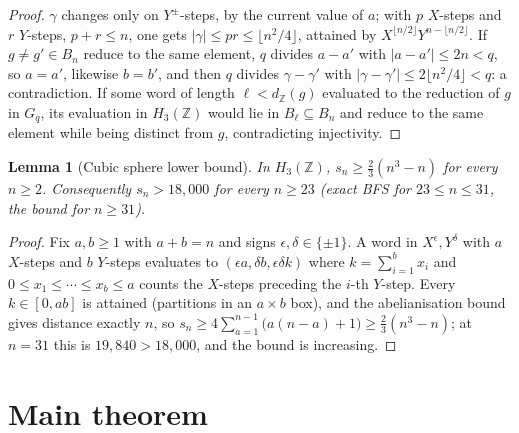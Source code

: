 \documentclass[11pt,a4paper]{article}
\theoremstyle{plain}
\newtheorem{lemma}{Lemma}
\theoremstyle{definition}
\begin{document}
    \begin{proof}
      $\gamma$ changes only on $Y^{\pm}$-steps, by the current value of $a$; with $p$ $X$-steps
      and $r$ $Y$-steps, $p + r \le n$, one gets $\lvert\gamma\rvert \le pr \le \lfloor
      n^2/4\rfloor$, attained by $X^{\lfloor n/2\rfloor}Y^{n - \lfloor n/2\rfloor}$.
      If $g \ne g' \in B_n$ reduce to the same element, $q$ divides $a-a'$ with
      $\lvert a-a'\rvert \le 2n < q$, so $a = a'$, likewise $b = b'$, and then $q$ divides
      $\gamma-\gamma'$ with $\lvert\gamma-\gamma'\rvert \le 2\lfloor n^2/4\rfloor < q$: a
      contradiction.
      If some word of length $\ell < d_{\mathbb{Z}}(g)$ evaluated to the reduction of $g$ in
      $G_q$, its evaluation in $H_3(\mathbb{Z})$ would lie in $B_\ell \subseteq B_n$ and reduce to
      the same element while being distinct from $g$, contradicting injectivity.
    \end{proof}

    \begin{lemma}[Cubic sphere lower bound]
      \label{lem:cubic}
      In $H_3(\mathbb{Z})$, $s_n \ge \tfrac{2}{3}(n^3 - n)$ for every $n \ge 2$.
      Consequently $s_n > 18{,}000$ for every $n \ge 23$ (exact BFS for $23 \le n \le 31$, the
      bound for $n \ge 31$).
    \end{lemma}

    \begin{proof}
      Fix $a, b \ge 1$ with $a + b = n$ and signs $\epsilon, \delta \in \{\pm 1\}$.
      A word in $X^{\epsilon}, Y^{\delta}$ with $a$ $X$-steps and $b$ $Y$-steps evaluates to
      $(\epsilon a, \delta b, \epsilon\delta k)$ where $k = \sum_{i=1}^{b} x_i$ and
      $0 \le x_1 \le \cdots \le x_b \le a$ counts the $X$-steps preceding the $i$-th $Y$-step.
      Every $k \in [0, ab]$ is attained (partitions in an $a \times b$ box), and the
      abelianisation bound gives distance exactly $n$, so
      $s_n \ge 4\sum_{a=1}^{n-1}\bigl(a(n-a)+1\bigr) \ge \tfrac{2}{3}(n^3-n)$; at $n = 31$ this is
      $19{,}840 > 18{,}000$, and the bound is increasing.
    \end{proof}

  \section{Main theorem}
    \label{sec:main}
\end{document}
